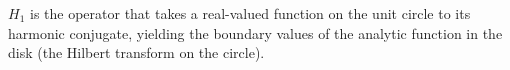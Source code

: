 
$H_1$ is the operator that takes a real-valued function on the unit circle to its harmonic conjugate, yielding the boundary values of the analytic function in the disk (the Hilbert transform on the circle).
